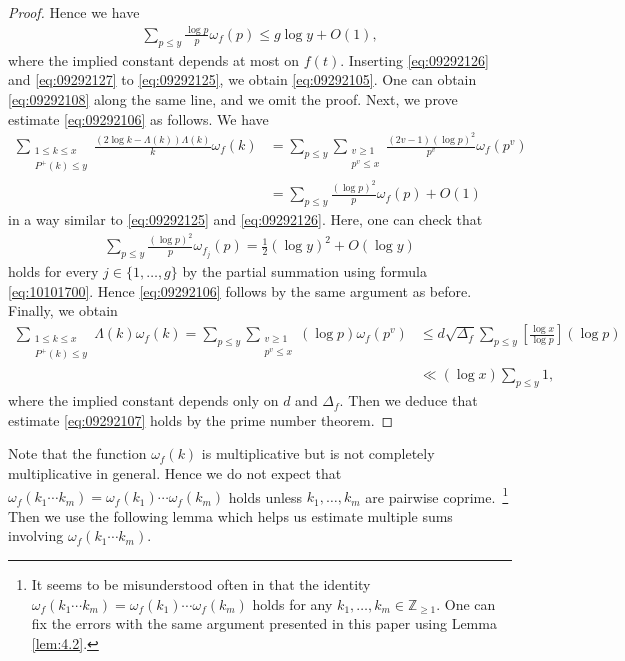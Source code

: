 \documentclass[a4paper,11pt]{amsart}
\theoremstyle{definition}
\numberwithin{equation}{section}
\begin{document}
\begin{proof}
Hence we have 
\begin{align}\label{eq:09292127}
\sum_{p \leq y} \frac{\log{p}}{p} \omega_f(p)
\leq g\log{y}+O(1), 
\end{align}
where the implied constant depends at most on $f(t)$.
Inserting \eqref{eq:09292126} and \eqref{eq:09292127} to \eqref{eq:09292125}, we obtain \eqref{eq:09292105}. 
One can obtain \eqref{eq:09292108} along the same line, and we omit the proof. 
Next, we prove estimate \eqref{eq:09292106} as follows. 
We have 
\begin{align*}
\sum_{\substack{1 \leq k \leq x \\ P^+(k) \leq y}} \frac{(2\log{k}-\Lambda(k)) \Lambda(k)}{k} \omega_f(k)
&= \sum_{p \leq y} \sum_{\substack{v \geq1 \\ p^v \leq x}} \frac{(2v-1)(\log{p})^2}{p^v} \omega_f(p^v) \\
&= \sum_{p \leq y} \frac{(\log{p})^2}{p} \omega_f(p) +O(1)
\end{align*}
in a way similar to \eqref{eq:09292125} and \eqref{eq:09292126}. 
Here, one can check that
\begin{align*}
\sum_{p \leq y} \frac{(\log{p})^2}{p} \omega_{f_j}(p)
= \frac{1}{2} (\log{y})^2+O(\log{y})
\end{align*}
holds for every $j \in \{1,\ldots,g\}$ by the partial summation using formula \eqref{eq:10101700}. 
Hence \eqref{eq:09292106} follows by the same argument as before. 
Finally, we obtain
\begin{align*}
\sum_{\substack{1 \leq k \leq x \\ P^+(k) \leq y}} \Lambda(k) \omega_f(k)
= \sum_{p \leq y} \sum_{\substack{v \geq1 \\ p^v \leq x}} (\log{p}) \omega_f(p^v) 
&\leq d \sqrt{\Delta_f} \sum_{p \leq y} \left[\frac{\log{x}}{\log{p}}\right] (\log{p}) \\
&\ll (\log{x}) \sum_{p \leq y} 1,  
\end{align*}
where the implied constant depends only on $d$ and $\Delta_f$. 
Then we deduce that estimate \eqref{eq:09292107} holds by the prime number theorem. 
\end{proof}

Note that the function $\omega_f(k)$ is multiplicative but is not completely multiplicative in general. 
Hence we do not expect that $\omega_f(k_1 \cdots k_m)=\omega_f(k_1) \cdots \omega_f(k_m)$ holds unless $k_1,\ldots,k_m $ are pairwise coprime.\
\footnote{
It seems to be misunderstood often in \cite{Timofeev1977} that the identity $\omega_f(k_1 \cdots k_m)=\omega_f(k_1) \cdots \omega_f(k_m)$ holds for any $k_1,\ldots,k_m \in \mathbb{Z}_{\geq1}$. 
One can fix the errors with the same argument presented in this paper using Lemma \ref{lem:4.2}. 
}
Then we use the following lemma which helps us estimate multiple sums involving $\omega_f(k_1 \cdots k_m)$. 
\end{document}
